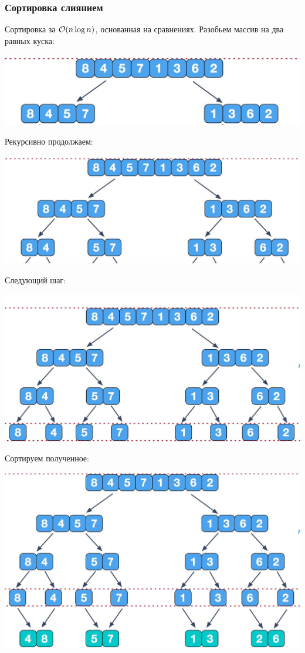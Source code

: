 \begin{multicols}{2}
    \subsubsection*{Сортировка слиянием}
    Сортировка за ${\cal O}(n\log n)$, основанная на сравнениях.
    Разобьем массив на два равных куска:
    \begin{center}
        \includegraphics[scale=0.25]{images/1st_step.png}        
    \end{center}
    Рекурсивно продолжаем:
    \begin{center}
        \includegraphics[scale=0.25]{images/2nd_step.png}
    \end{center}
    Следующий шаг:
    \begin{center}
        \includegraphics[scale=0.25]{images/3rd_step.png}
    \end{center}
    Сортируем полученное:
    \begin{center}
        \includegraphics[scale=0.25]{images/4th_step.png}

\end{center}
\end{multicols}
